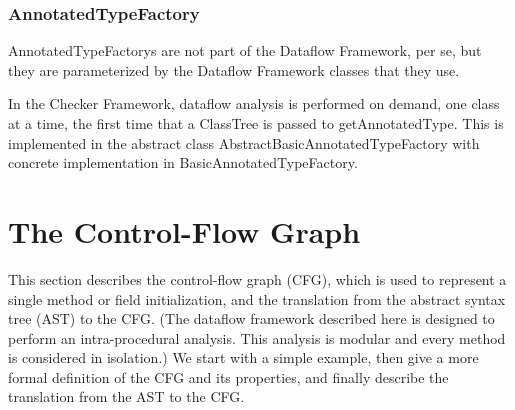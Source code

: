 \subsubsection{AnnotatedTypeFactory}
\label{sec:annotated_type_factory_classes}

    AnnotatedTypeFactorys are not part of the Dataflow Framework, per se, but they are parameterized by the Dataflow Framework classes that they use.

    
    In the Checker Framework, dataflow analysis is performed on demand, one class at a time, the first time that a ClassTree is passed to getAnnotatedType.   This is implemented in the abstract class AbstractBasicAnnotatedTypeFactory with concrete implementation in BasicAnnotatedTypeFactory.
    
    






\section{The Control-Flow Graph}
\label{sec:cfg}


This section
describes the control-flow graph (CFG), which is used to represent a single method or field initialization, and the
translation from the abstract syntax tree (AST) to the CFG\@.
(The dataflow framework described here is designed to perform an intra-procedural analysis.
This analysis is modular and every method is considered in isolation.)
 We start with a simple
example, then give a more formal definition of the CFG and its properties, and finally
describe the translation from the AST to the CFG.


